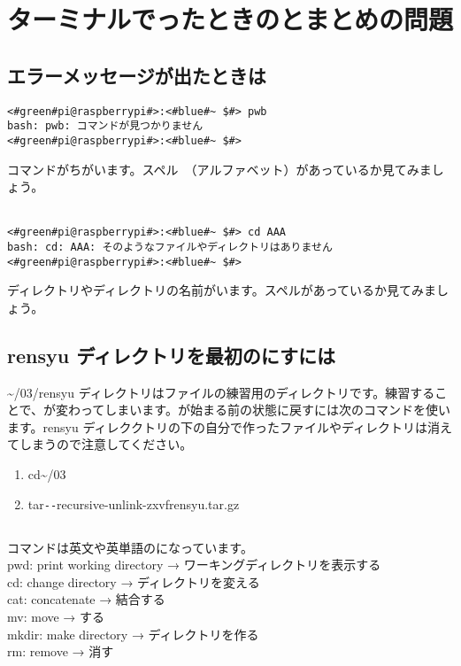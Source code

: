 \section{ターミナルでったときのとまとめの問題}

\subsection{エラーメッセージが出たときは}
\begin{lstlisting}[caption=コマンドがちがうときの例, label=cmdMiss]
<#green#pi@raspberrypi#>:<#blue#~ $#> pwb
bash: pwb: コマンドが見つかりません
<#green#pi@raspberrypi#>:<#blue#~ $#> 
\end{lstlisting}
コマンドがちがいます。スペル　（アルファベット）があっているか見てみましょう。\\\\

\begin{lstlisting}[caption=ディレクトリやファイルの名前がちがうときの例, label=nameMiss]
<#green#pi@raspberrypi#>:<#blue#~ $#> cd AAA
bash: cd: AAA: そのようなファイルやディレクトリはありません
<#green#pi@raspberrypi#>:<#blue#~ $#> 
\end{lstlisting}
ディレクトリやディレクトリの名前がいます。スペルがあっているか見てみましょう。\\


\subsection{rensyu ディレクトリを最初のにすには}
\textasciitilde /03/rensyu ディレクトリはファイルの練習用のディレクトリです。練習することで、が変わってしまいます。が始まる前の状態に戻すには次のコマンドを使います。rensyu ディレククトリの下の自分で作ったファイルやディレクトリは消えてしまうので注意してください。\\
\begin{enumerate}
\item  cd\textvisiblespace \textasciitilde /03
\item  tar\textvisiblespace \verb|--|recursive-unlink\textvisiblespace -zxvf\textvisiblespace rensyu.tar.gz
\end{enumerate}

\subsection{}
\label{英語と日本語の対応表}
コマンドは英文や英単語のになっています。\\
pwd: print working directory → ワーキングディレクトリを表示する\\
cd: change directory → ディレクトリを変える\\
cat: concatenate → 結合する\\
mv: move → する\\
mkdir: make directory → ディレクトリを作る\\
rm: remove → 消す\\
